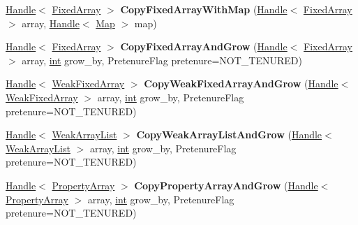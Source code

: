 \begin{DoxyCompactItemize}
\mbox{\hyperlink{classv8_1_1internal_1_1Handle}{Handle}}$<$ \mbox{\hyperlink{classv8_1_1internal_1_1FixedArray}{Fixed\+Array}} $>$ {\bfseries Copy\+Fixed\+Array\+With\+Map} (\mbox{\hyperlink{classv8_1_1internal_1_1Handle}{Handle}}$<$ \mbox{\hyperlink{classv8_1_1internal_1_1FixedArray}{Fixed\+Array}} $>$ array, \mbox{\hyperlink{classv8_1_1internal_1_1Handle}{Handle}}$<$ \mbox{\hyperlink{classv8_1_1internal_1_1Map}{Map}} $>$ map)
\item 
\mbox{\label{classv8_1_1internal_1_1Factory_a1a06a21a533e14d88ffc89f429a70ca5}} 
\mbox{\hyperlink{classv8_1_1internal_1_1Handle}{Handle}}$<$ \mbox{\hyperlink{classv8_1_1internal_1_1FixedArray}{Fixed\+Array}} $>$ {\bfseries Copy\+Fixed\+Array\+And\+Grow} (\mbox{\hyperlink{classv8_1_1internal_1_1Handle}{Handle}}$<$ \mbox{\hyperlink{classv8_1_1internal_1_1FixedArray}{Fixed\+Array}} $>$ array, \mbox{\hyperlink{classint}{int}} grow\+\_\+by, Pretenure\+Flag pretenure=N\+O\+T\+\_\+\+T\+E\+N\+U\+R\+ED)
\item 
\mbox{\label{classv8_1_1internal_1_1Factory_a3e696c05c3e0b2fcb32561c1c313880c}} 
\mbox{\hyperlink{classv8_1_1internal_1_1Handle}{Handle}}$<$ \mbox{\hyperlink{classv8_1_1internal_1_1WeakFixedArray}{Weak\+Fixed\+Array}} $>$ {\bfseries Copy\+Weak\+Fixed\+Array\+And\+Grow} (\mbox{\hyperlink{classv8_1_1internal_1_1Handle}{Handle}}$<$ \mbox{\hyperlink{classv8_1_1internal_1_1WeakFixedArray}{Weak\+Fixed\+Array}} $>$ array, \mbox{\hyperlink{classint}{int}} grow\+\_\+by, Pretenure\+Flag pretenure=N\+O\+T\+\_\+\+T\+E\+N\+U\+R\+ED)
\item 
\mbox{\label{classv8_1_1internal_1_1Factory_a642dcf90b143eddb4cd1f7f000c12252}} 
\mbox{\hyperlink{classv8_1_1internal_1_1Handle}{Handle}}$<$ \mbox{\hyperlink{classv8_1_1internal_1_1WeakArrayList}{Weak\+Array\+List}} $>$ {\bfseries Copy\+Weak\+Array\+List\+And\+Grow} (\mbox{\hyperlink{classv8_1_1internal_1_1Handle}{Handle}}$<$ \mbox{\hyperlink{classv8_1_1internal_1_1WeakArrayList}{Weak\+Array\+List}} $>$ array, \mbox{\hyperlink{classint}{int}} grow\+\_\+by, Pretenure\+Flag pretenure=N\+O\+T\+\_\+\+T\+E\+N\+U\+R\+ED)
\item 
\mbox{\label{classv8_1_1internal_1_1Factory_ad4b5efd955518d7753193f907a6d4514}} 
\mbox{\hyperlink{classv8_1_1internal_1_1Handle}{Handle}}$<$ \mbox{\hyperlink{classv8_1_1internal_1_1PropertyArray}{Property\+Array}} $>$ {\bfseries Copy\+Property\+Array\+And\+Grow} (\mbox{\hyperlink{classv8_1_1internal_1_1Handle}{Handle}}$<$ \mbox{\hyperlink{classv8_1_1internal_1_1PropertyArray}{Property\+Array}} $>$ array, \mbox{\hyperlink{classint}{int}} grow\+\_\+by, Pretenure\+Flag pretenure=N\+O\+T\+\_\+\+T\+E\+N\+U\+R\+ED)

\end{DoxyCompactItemize}
